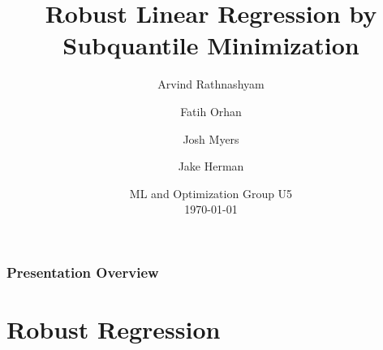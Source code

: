 \documentclass[
11pt, %
serif
]{beamer}
\title[Subquantile Minimization]{Robust Linear Regression by\\ Subquantile Minimization} %
\author[]{Arvind Rathnashyam \and Fatih Orhan \and Josh Myers \and Jake Herman} %
\institute[Rensselaer Polytechnic Institute]{Rensselaer Polytechnic Institute \\ \smallskip \textit{(rathna, orhanf, myersj5, hermaj2)@rpi.edu}} %
\date[\today]{ML and Optimization Group U5 \\ \today} %
\begin{document}
	
	
	\begin{frame}
		\titlepage %
	\end{frame}
	
	
	
	\begin{frame}
		\frametitle{Presentation Overview} %
		
		\tableofcontents %
	\end{frame}
	
	
	\section{Robust Regression} %
	
\end{document}
